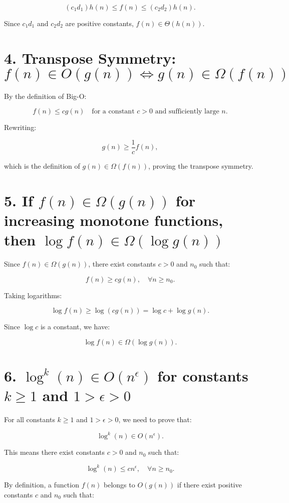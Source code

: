 \documentclass{article}
\begin{document}
\[
(c_1 d_1) h(n) \leq f(n) \leq (c_2 d_2) h(n).
\]

Since \( c_1 d_1 \) and \( c_2 d_2 \) are positive constants, \( f(n) \in \Theta(h(n)) \).

\section*{4. Transpose Symmetry: \( f(n) \in O(g(n)) \iff g(n) \in \Omega(f(n)) \)}

By the definition of Big-O:

\[
f(n) \leq c g(n) \quad \text{for a constant } c > 0 \text{ and sufficiently large } n.
\]

Rewriting:

\[
g(n) \geq \frac{1}{c} f(n),
\]

which is the definition of \( g(n) \in \Omega(f(n)) \), proving the transpose symmetry. 

\section*{5. If \( f(n) \in \Omega(g(n)) \) for increasing monotone functions, then \( \log f(n) \in \Omega(\log g(n)) \)}

Since \( f(n) \in \Omega(g(n)) \), there exist constants \( c > 0 \) and \( n_0 \) such that:

\[
f(n) \geq c g(n), \quad \forall n \geq n_0.
\]

Taking logarithms:

\[
\log f(n) \geq \log (c g(n)) = \log c + \log g(n).
\]

Since \( \log c \) is a constant, we have:

\[
\log f(n) \in \Omega(\log g(n)).
\]

\section*{6. \( \log^k(n) \in O(n^\epsilon) \) for constants \( k \geq 1 \) and \( 1 > \epsilon > 0 \) }

For all constants \( k \geq 1 \) and \( 1 > \epsilon > 0 \), we need to prove that:

\[
\log^k(n) \in O(n^\epsilon).
\]

This means there exist constants \( c > 0 \) and \( n_0 \) such that:

\[
\log^k(n) \leq c n^\epsilon, \quad \forall n \geq n_0.
\]

By definition, a function \( f(n) \) belongs to \( O(g(n)) \) if there exist positive constants \( c \) and \( n_0 \) such that:
\end{document}
